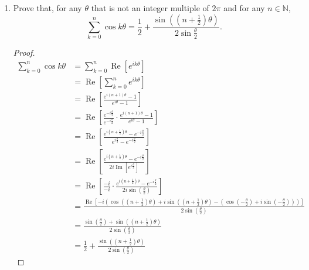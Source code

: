 \documentclass[10pt]{article}
\newcommand{\N}{\mathbb{N}}
\DeclareMathOperator*{\re}{Re}
\DeclareMathOperator*{\im}{Im}
\begin{document}
\begin{enumerate}
\begin{proof}
\begin{comment}
Next, assume $n$ does not divide $m$.  In this case, $\omega^m \neq 1$, so we may apply the formula for a finite geometric series to obtain
$$
\sum\limits_{k=0}^{n-1} \omega^{mk} = \frac{1 - \omega^{mn}}{1 - \omega^m}
=
\frac{1 - 1^m}{1 - \omega^m}
= 0.
$$
Applying the formula to the second summation gives
$$
\sum\limits_{k=0}^{n-1} (-1)^k \omega^{mk}
=
\sum\limits_{k=0}^{n-1} (-\omega^m)^k
=
\frac{1 - (-\omega^m)^n}{1 -(- \omega^m)}
=
\dfrac{1 - (-\omega^m)^n}{1 + \omega^m}
=
\begin{cases}
\dfrac{1 - \omega^{mn}}{1 + \omega^m} & \text{if } 2 \mid n
\vspace{.2cm} \\
\dfrac{1 + \omega^{mn}}{1 + \omega^m} & \text{if } 2 \nmid n
\end{cases}
$$
$$
=
\begin{cases}
0 & \text{if } 2 \mid n
\vspace{.2cm} \\
\dfrac{2}{1 + \omega^m} & \text{if } 2 \nmid n
\end{cases}
$$
\end{comment}
\end{proof}
\item Prove that, for any $\theta$ that is not an integer multiple of $2\pi$ and for any $n \in \N$,
$$
\sum_{k=0}^n \cos k\theta = \frac12 + \frac{\sin((n+\frac12)\theta)}{2\sin \frac{\theta}{2}}.
$$
\begin{proof}
\begin{align*}
\sum_{k=0}^n \cos k\theta
&= \sum_{k=0}^n \re [e^{i k\theta}]
\\
&= \re \left[ \sum_{k=0}^n e^{i k\theta} \right]
\\
&= \re \left[ \frac{e^{i (n+1) \theta} - 1}{e^{i\theta} - 1} \right]
\\
&= \re \left[\frac{e^{-i\frac{\theta}{2}}}{e^{-i\frac{\theta}{2}}} \cdot \frac{e^{i (n+1) \theta} - 1}{e^{i\theta} - 1} \right]
\\
&= \re \left[ \frac{e^{i (n+\frac12) \theta} - e^{-i\frac{\theta}{2}}}{e^{i\frac{\theta}{2}} - e^{-i\frac{\theta}{2}}} \right]
\\
&= \re \left[ \frac{e^{i (n+\frac12) \theta} - e^{-i\frac{\theta}{2}}}{2i \im [e^{i\frac{\theta}{2}}]} \right]
\\
&= \re \left[\frac{-i}{-i} \cdot \frac{e^{i (n+\frac12) \theta} - e^{-i\frac{\theta}{2}}}{2i \sin (\frac{\theta}{2})} \right]
\\
&= \frac{\re [ -i (\cos((n+\frac12) \theta) + i \sin ((n+\frac12) \theta) - ( \cos ( -\frac{\theta}{2}) + i \sin (-\frac{\theta}{2}))) ]}{2\sin (\frac{\theta}{2})}
\\
&= \frac{ \sin(\frac{\theta}{2}) + \sin ( (n + \frac12)\theta )}{2\sin (\frac{\theta}{2})}
\\
&= \frac12 + \frac{ \sin ( (n + \frac12)\theta )}{2\sin (\frac{\theta}{2})}
\end{align*}
\end{proof}


\end{enumerate}
\end{document}
